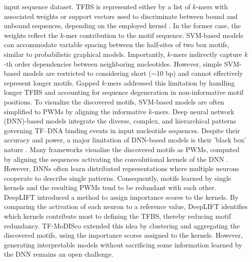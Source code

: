 \documentclass[a4paper, titlepage, openright]{book}
\begin{document}
input sequence dataset. TFBS is represented either by a list of $k$-mers with associated weights or support vectors used to discriminate between bound and unbound sequences, depending on the employed kernel \citep{boeva2016analysis}. In the former case, the weights reflect the $k$-mer contribution to the motif sequence. SVM-based models can accommodate variable spacing between the half-sites of two box motifs, similar to probabilistic graphical models. Importantly, $k$-mers indirectly capture $k$-th order dependencies between neighboring nucleotides. However, simple SVM-based models are restricted to considering short ($\sim$10 bp) and cannot effectively represent longer motifs. Gapped $k$-mers \citep{ghandi2014robust} addressed this limitation by handling longer TFBS and accounting for sequence degeneration in non-informative motif positions. To visualize the discovered motifs, SVM-based models are often simplified to PWMs by aligning the informative $k$-mers. Deep neural network (DNN)-based models integrate the diverse, complex, and hierarchical patterns governing TF–DNA binding events in input nucleotide sequences. Despite their accuracy and power, a major limitation of DNN-based models is their 'black box' nature \citep{park2020enhancing}. Many frameworks visualize the discovered motifs as PWMs, computed by aligning the sequences activating the convolutional kernels of the DNN \citep{koo2020deep}. However, DNNs often learn distributed representations where multiple neurons cooperate to describe single patterns. Consequently, motifs learned by single kernels and the resulting PWMs tend to be redundant with each other. DeepLIFT \citep{shrikumar2017learning} introduced a method to assign importance scores to the kernels. By comparing the activation of each neuron to a reference value, DeepLIFT identifies which kernels contribute most to defining the TFBS, thereby reducing motif redundancy. TF-MoDISco \citep{avsec2021base} extended this idea by clustering and aggregating the discovered motifs, using the importance scores assigned to the kernels. However, generating interpretable models without sacrificing some information learned by the DNN remains an open challenge.

\end{document}
